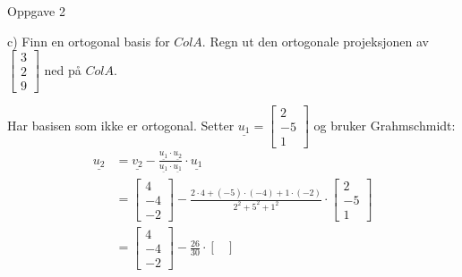 \documentclass[11pt, a4paper, norsk]{article}
\begin{document}
               \begin{Example}{Oppgave 2}{}
                
                c)
                Finn en ortogonal basis for $ColA$. Regn ut den ortogonale projeksjonen av $\begin{bmatrix}
                    3 \\
                    2 \\
                    9
                \end{bmatrix}$ ned på $ColA$.
                    
                Har basisen som ikke er ortogonal. Setter $\underline{u_1} = \begin{bmatrix}
                    2 \\
                    -5 \\
                    1
                \end{bmatrix}$ og bruker Grahmschmidt:
                \begin{align*}
                    \underline{u_2} &= \underline{v_2} - \frac{\underline{u_1} \cdot \underline{u_2}}{\underline{u_1} \cdot \underline{u_1}} \cdot \underline{u_1}
                    \\
                                    &= \begin{bmatrix}
                                        4 \\
                                        -4 \\
                                        -2
                                    \end{bmatrix} - \frac{2 \cdot 4 + (-5) \cdot (-4) + 1 \cdot (-2)}{2^2 + 5^2 + 1^2} \cdot \begin{bmatrix}
                                        2 \\
                                        -5 \\
                                        1
                                    \end{bmatrix}
                                    \\
                                    &= \begin{bmatrix}
                                        4 \\
                                        -4 \\
                                        -2
                                    \end{bmatrix} - \frac{26}{30} \cdot \begin{bmatrix}

\end{bmatrix}
\end{align*}
\end{Example}
\end{document}
